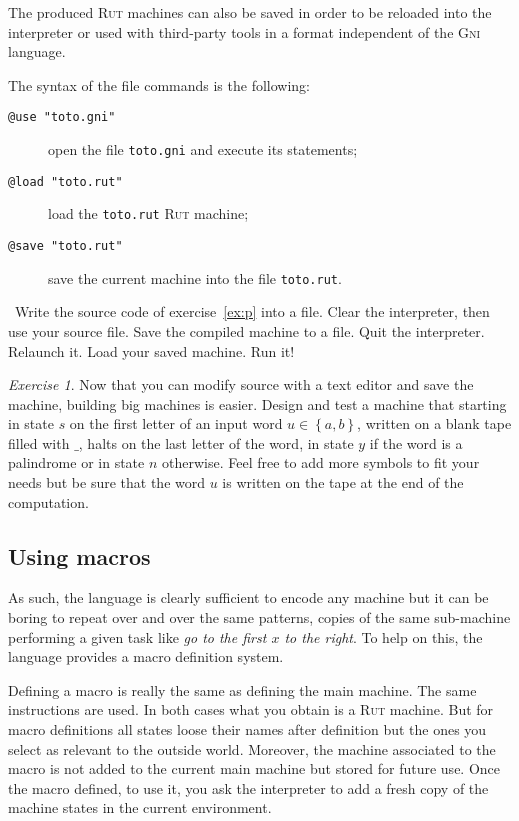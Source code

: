 \documentclass[a4paper,11pt]{article}
\theoremstyle{remark}
\newtheorem{exercise}{Exercise}
\newcommand\doit[1]{\medskip\par\noindent\ding{229}~\textsf{#1}}
\begin{document}
\medskip
The produced \textsc{Rut} machines can also be saved in order to be reloaded into the
interpreter or used with third-party tools in a format independent of the \textsc{Gni}
language.

\medskip
\noindent The syntax of the file commands is the following:
\begin{description}
	\item[\texttt{@use "toto.gni"}] open the file \texttt{toto.gni} and execute its statements;
	\item[\texttt{@load "toto.rut"}] load the \texttt{toto.rut} \textsc{Rut} machine;
	\item[\texttt{@save "toto.rut"}] save the current machine into the file \texttt{toto.rut}.
\end{description}

\doit{Write the source code of exercise~\ref{ex:p} into a file. Clear the interpreter, then
use your source file. Save the compiled machine to a file. Quit the interpreter. 
Relaunch it. Load your saved machine. Run it!}

\begin{exercise} Now that you can modify source with a text editor and save the machine,
building big machines
is easier. Design and test a machine that starting in state $s$ on the first letter of an input
word $u\in\left\{a,b\right\}$, written on a blank tape filled with $\_$, halts on the last
letter of the word, in state $y$ if the word is a palindrome or in state $n$ otherwise. Feel free
to add more symbols to fit your needs but be sure that the word $u$ is written on the tape at
the end of the computation.
\end{exercise}

\subsection{Using macros}

As such, the language is clearly sufficient to encode any machine but it can be boring to
repeat over and over the same patterns, copies of the same sub-machine performing a given
task like \emph{go to the first $x$ to the right}. To help on this, the language provides 
a macro definition system.

\medskip
Defining a macro is really the same as defining the main machine. The same instructions are
used. In both cases what you obtain is a \textsc{Rut} machine. But for macro definitions all
states loose their names after definition but the ones you select as relevant to the outside
world. Moreover, the machine associated to the macro is not added to the current main machine
but stored for future use. Once the macro defined, to use it, you ask the interpreter to add
a fresh copy of the machine states in the current environment.
\end{document}
